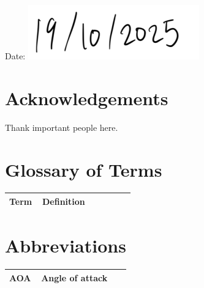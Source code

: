 \documentclass[12pt, a4paper, ukenglish]{article}
\begin{document}
\vspace{1cm}
Date: \includegraphics[width=0.2\linewidth]{figures/date.png}

\newpage

\setlength{\parskip}{6pt}
\renewcommand{\contentsname}{\large{Table of Contents}}
\tableofcontents
\newpage
\setlength{\parskip}{9pt}

\section*{Acknowledgements}

\label{sec:Acknowledgements1}

Thank important people here.



\newpage

\section*{Glossary of Terms}

\begin{longtable}{p{0.25\linewidth} p{0.70\linewidth}}
    \toprule
    \textbf{Term} & \textbf{Definition} \\
    \midrule
    \endhead
    \bottomrule
\end{longtable}
\addtocounter{table}{-1}

\section*{Abbreviations}

\begin{longtable}{p{0.25\linewidth} p{0.70\linewidth}}
    \toprule
    \textbf{AOA} & \textbf{Angle of attack} \\
    \midrule
    \endhead
    \bottomrule
\end{longtable}
\addtocounter{table}{-1}

\printnomenclature

\clearpage
\setlength{\parskip}{9pt}
\end{document}
